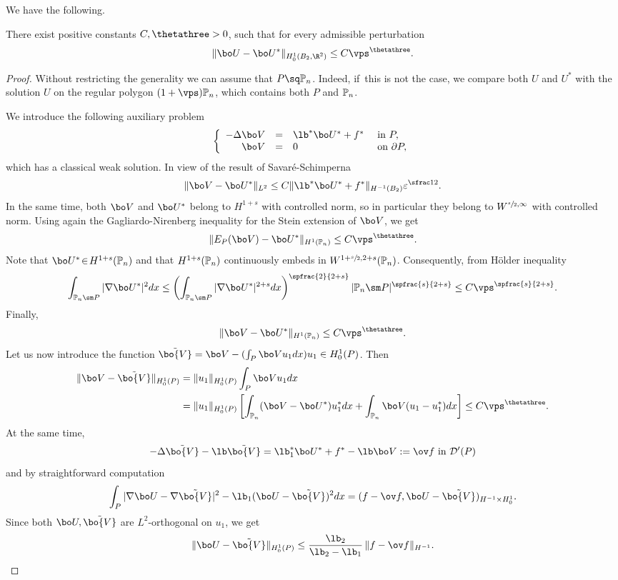 We have the following.
\begin{lemma} \label{bobu29}
There exist positive constants $C, \thetathree >0$, such that for every admissible perturbation
\[
\|\bo U-\bo U^*\|_{H^1_0(B_2, \R^2)} \le C \vps^\thetathree.
\]
\end{lemma}
\begin{proof}
Without restricting the generality we can assume that $P \sq \Bbb P_n$. Indeed, if~this is not the case, we compare both $U$ and $U^*$ with the solution $U$ on the regular polygon $(1+\vps) \Bbb P_n$, which contains both $P$ and $\Bbb P_n$.

We introduce the following auxiliary problem
\begin{equation}\left\{ \begin{array}{rcll}
-\Delta \bo V & =&\lb^* \bo U^* + f^* & \text{ in }P,\\
\bo V &= &0 & \text{ on }\partial P,
\end{array} \right.
\end{equation}
which has a classical weak solution. In view of the result of Savaré-Schimperna \cite[Th.\,8.5]{SaSc02}
\begin{equation}\label{bobu42}
\|\bo V- \bo U^*\|_{L^2} \le C \| \lb^* \bo U^* + f^*\|_{H^{-1} (B_2)} \varepsilon^{\sfrac 12}.
\end{equation}
In the same time, both $\bo V$ and $\bo U^*$ belong to $H^{1+s}$ with controlled norm, so in particular they belong to $W^{\sfrac s2, \infty}$ with controlled norm. Using again the Gagliardo-Nirenberg inequality for the Stein extension of $\bo V$, we get
\[
\|E_P(\bo V)- \bo U^*\|_{H^1(\Bbb P_n)} \le C \vps^\thetathree.
\]
Note that $\bo U^* \!\in\! H^{1+s} (\Bbb P_n)$ and that $H^{1+s} (\Bbb P_n)$ continuously embeds in $W^{1+\sfrac s2, 2+s} (\Bbb P_n)$. Consequently, from Hölder inequality
\[
\int_{\Bbb P_n \sm P} |\nabla \bo U^* |^2 dx \le \left(\int_{\Bbb P_n \sm P} |\nabla \bo U^* |^{2+s} dx\right)^{\spfrac{2}{2+s}} | \Bbb P_n \sm P|^ {\spfrac{s}{2+s}} \le C\vps^{\spfrac{s}{2+s}}.
\]
Finally,
\[
\|\bo V- \bo U^*\|_{H^1(\Bbb P_n)} \le C \vps^\thetathree.
\]
Let us now introduce the function
$\tilde{\bo{V}}= \bo V - (\int_P \bo Vu_1 dx)u_1\in H^1_0(P)$. Then
\begin{align*} \|\bo V-\tilde{\bo{V}} \|_{H^1_0(P)} & = \|u_1\|_{H^1_0(P)} \int _P \bo Vu_1 dx \\
& = \|u_1\|_{H^1_0(P)}\left[\int_{\Bbb P_n} (\bo V- \bo U^*)u_1^* dx + \int_{\mathbb P_n} \bo V(u_1-u_1^*) dx\right]\le C \vps^\thetathree.
\end{align*}
At the same time,
\[
-\Delta \tilde{\bo{V}} - \lb \tilde{\bo{V}}= \lb_1^* \bo U^* +f^*-\lb\bo V := \ov f \mbox{ in } {\mathcal D}'(P)
\]
and by straightforward computation
\[
\int_{P} |\nabla \bo U -\nabla \tilde{\bo{V}} |^2 - \lb_1 (\bo U -\tilde{\bo{V}})^2 dx = (f -\ov f, \bo U -\tilde{\bo{V}})_{H^{-1}\times H_0^1}.
\]
Since both $ \bo U, \tilde{\bo{V}}$ are $L^2$-orthogonal on $u_1$, we get
\[
\| \bo U -\tilde{\bo{V}} \|_{H^1_0(P)} \le \frac{\lb_2}{\lb_2-\lb_1}\, \| f -\ov f\| _{H^{-1}}.
\]


\end{proof}
